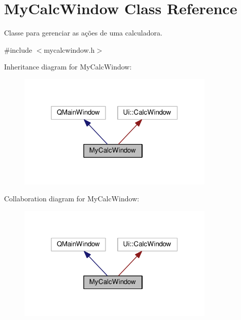 \hypertarget{classMyCalcWindow}{}\section{My\+Calc\+Window Class Reference}
\label{classMyCalcWindow}


Classe para gerenciar as ações de uma calculadora.  




{\ttfamily \#include $<$mycalcwindow.\+h$>$}



Inheritance diagram for My\+Calc\+Window\+:
\nopagebreak
\begin{figure}[H]
\begin{center}
\leavevmode
\includegraphics[width=266pt]{d9/d04/classMyCalcWindow__inherit__graph}
\end{center}
\end{figure}


Collaboration diagram for My\+Calc\+Window\+:
\nopagebreak
\begin{figure}[H]
\begin{center}
\leavevmode
\includegraphics[width=266pt]{d6/dbc/classMyCalcWindow__coll__graph}
\end{center}
\end{figure}
